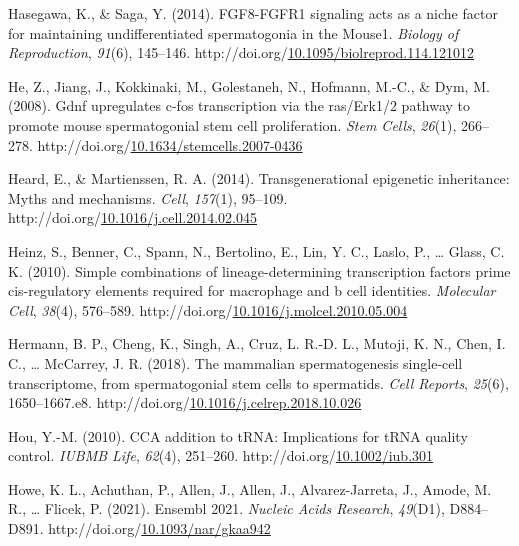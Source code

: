 \documentclass[12pt,twoside]{reedthesis}
\newlength{\cslhangindent}
\newenvironment{CSLReferences}[2] %
 {%
  \setlength{\parindent}{0pt}
  \ifodd #1 \everypar{\setlength{\hangindent}{\cslhangindent}}\ignorespaces\fi
  \ifnum #2 > 0
  \setlength{\parskip}{#2\baselineskip}
  \fi
 }%
 {}
\begin{document}
\begin{CSLReferences}{1}{0}
\leavevmode{}%
Hasegawa, K., \& Saga, Y. (2014). FGF8-FGFR1 signaling acts as a niche factor for maintaining undifferentiated spermatogonia in the Mouse1. \emph{Biology of Reproduction}, \emph{91}(6), 145--146. http://doi.org/\href{https://doi.org/10.1095/biolreprod.114.121012}{10.1095/biolreprod.114.121012}

\leavevmode{}%
He, Z., Jiang, J., Kokkinaki, M., Golestaneh, N., Hofmann, M.-C., \& Dym, M. (2008). Gdnf upregulates c-fos transcription via the ras/Erk1/2 pathway to promote mouse spermatogonial stem cell proliferation. \emph{Stem Cells}, \emph{26}(1), 266--278. http://doi.org/\href{https://doi.org/10.1634/stemcells.2007-0436}{10.1634/stemcells.2007-0436}

\leavevmode{}%
Heard, E., \& Martienssen, R. A. (2014). Transgenerational epigenetic inheritance: Myths and mechanisms. \emph{Cell}, \emph{157}(1), 95--109. http://doi.org/\href{https://doi.org/10.1016/j.cell.2014.02.045}{10.1016/j.cell.2014.02.045}

\leavevmode{}%
Heinz, S., Benner, C., Spann, N., Bertolino, E., Lin, Y. C., Laslo, P., \ldots{} Glass, C. K. (2010). Simple combinations of lineage-determining transcription factors prime cis-regulatory elements required for macrophage and b cell identities. \emph{Molecular Cell}, \emph{38}(4), 576--589. http://doi.org/\href{https://doi.org/10.1016/j.molcel.2010.05.004}{10.1016/j.molcel.2010.05.004}

\leavevmode{}%
Hermann, B. P., Cheng, K., Singh, A., Cruz, L. R.-D. L., Mutoji, K. N., Chen, I. C., \ldots{} McCarrey, J. R. (2018). The mammalian spermatogenesis single-cell transcriptome, from spermatogonial stem cells to spermatids. \emph{Cell Reports}, \emph{25}(6), 1650--1667.e8. http://doi.org/\href{https://doi.org/10.1016/j.celrep.2018.10.026}{10.1016/j.celrep.2018.10.026}

\leavevmode{}%
Hou, Y.-M. (2010). CCA addition to tRNA: Implications for tRNA quality control. \emph{IUBMB Life}, \emph{62}(4), 251--260. http://doi.org/\href{https://doi.org/10.1002/iub.301}{10.1002/iub.301}

\leavevmode{}%
Howe, K. L., Achuthan, P., Allen, J., Allen, J., Alvarez-Jarreta, J., Amode, M. R., \ldots{} Flicek, P. (2021). Ensembl 2021. \emph{Nucleic Acids Research}, \emph{49}(D1), D884--D891. http://doi.org/\href{https://doi.org/10.1093/nar/gkaa942}{10.1093/nar/gkaa942}


\end{CSLReferences}
\end{document}
